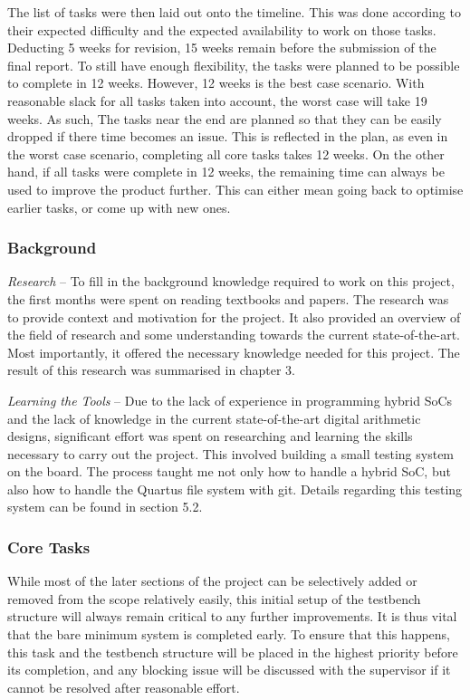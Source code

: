 The list of tasks were then laid out onto the timeline.
This was done according to their expected difficulty and the expected
availability to work on those tasks.
Deducting 5 weeks for revision, 15 weeks remain before the submission of the
final report.
To still have enough flexibility, the tasks were planned to be possible to
complete in 12 weeks.
However, 12 weeks is the best case scenario.
With reasonable slack for all tasks taken into account, the worst case will
take 19 weeks.
As such, The tasks near the end are planned so that they can be easily dropped
if there time becomes an issue.
This is reflected in the plan, as even in the worst case scenario, completing
all core tasks takes 12 weeks.
On the other hand, if all tasks were complete in 12 weeks, the remaining
time can always be used to improve the product further.
This can either mean going back to optimise earlier tasks,
or come up with new ones.

\subsubsection{Background}

\textit{Research} --
To fill in the background knowledge required to work on this project, the first
months were spent on reading textbooks and papers.
The research was to provide context and motivation for the project.
It also provided an overview of the field of research and some understanding
towards the current state-of-the-art.
Most importantly, it offered the necessary knowledge needed for this project.
The result of this research was summarised in chapter 3.

\textit{Learning the Tools} --
Due to the lack of experience in programming hybrid SoCs and the lack of
knowledge in the current state-of-the-art digital arithmetic designs,
significant effort was spent on researching and learning the skills
necessary to carry out the project.
This involved building a small testing system on the board.
The process taught me not only how to handle a hybrid SoC, but also how to
handle the Quartus file system with git.
Details regarding this testing system can be found in section 5.2.

\subsubsection{Core Tasks}

While most of the later sections of the project can be selectively added or
removed from the scope relatively easily, this initial setup of the testbench
structure will always remain critical to any further improvements.
It is thus vital that the bare minimum system is completed early.
To ensure that this happens, this task and the testbench structure will be
placed in the highest priority before its completion, and any blocking issue
will be discussed with the supervisor if it cannot be resolved after reasonable
effort.

